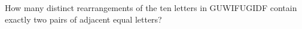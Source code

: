 How many distinct rearrangements of the ten letters in GUWIFUGIDF contain exactly two pairs of adjacent equal letters?
